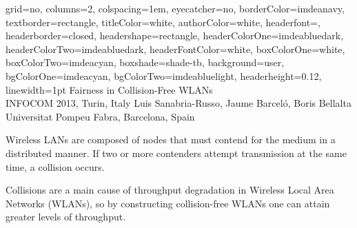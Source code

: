 \documentclass[portrait,a0paper]{baposter}
\begin{document}
\begin{poster}
{
	grid=no,
	columns=2,
	colspacing=1em,
	eyecatcher=no,
	borderColor=imdeanavy,
	textborder=rectangle,
  	titleColor=white,
    	authorColor=white,
	headerfont=\textsf,
	headerborder=closed,
	headershape=rectangle,
	headerColorOne=imdeabluedark,
	headerColorTwo=imdeabluedark,
	headerFontColor=white,
	boxColorOne=white,
	boxColorTwo=imdeacyan,
	boxshade=shade-tb,
	background=user,
	bgColorOne=imdeacyan,
	bgColorTwo=imdeabluelight,
	headerheight=0.12\textheight,
	linewidth=1pt
}
{
}
{Fairness in Collision-Free WLANs\\ 
\normalsize INFOCOM 2013, Turin, Italy}
{
	Luis Sanabria-Russo, Jaume Barcel{\'o}, Boris Bellalta
	\\
	\normalsize Universitat Pompeu Fabra, Barcelona, Spain
}



{

Wireless LANs are composed of nodes that must contend for the medium in a distributed manner. If two or more contenders attempt transmission at the same time, a collision occurs. %

Collisions are a main cause of throughput degradation in Wireless Local Area Networks (WLANs), so by constructing collision-free WLANs one can attain greater levels of throughput.


}


\end{poster}
\end{document}
